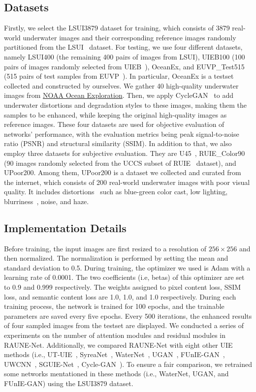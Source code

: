 \documentclass[runningheads]{llncs}
\begin{document}
\subsection{Datasets}
Firstly, we select the LSUI3879 dataset for training, which consists of 3879 real-world underwater images and their corresponding reference images randomly partitioned from the LSUI~\cite{peng2023ushape} dataset. For testing, we use four different datasets, namely LSUI400 (the remaining 400 pairs of images from LSUI), UIEB100 (100 pairs of images randomly selected from UIEB~\cite{li2020underwater}), OceanEx, and EUVP\_Test515 (515 pairs of test samples from EUVP~\cite{islam2020fast}). In particular, OceanEx is a testset collected and constructed by ourselves. We gather 40 high-quality underwater images from \href{https://oceanexplorer.noaa.gov/image-gallery/welcome.html}{NOAA Ocean Exploration}. Then, we apply CycleGAN~\cite{Zhu_2017_ICCV} to add underwater distortions and degradation styles to these images, making them the samples to be enhanced, while keeping the original high-quality images as reference images. These four datasets are used for objective evaluation of networks' performance, with the evaluation metrics being peak signal-to-noise ratio (PSNR) and structural similarity (SSIM). In addition to that, we also employ three datasets for subjective evaluation. They are U45~\cite{li2019fusion}, RUIE\_Color90 (90 images randomly selected from the UCCS subset of RUIE~\cite{liu2020real} dataset), and UPoor200. Among them, UPoor200 is a dataset we collected and curated from the internet, which consists of 200 real-world underwater images with poor visual quality. It includes distortions~\cite{liu2019unsupervised} such as blue-green color cast, low lighting, blurriness~\cite{liu2017quality}, noise, and haze.

\subsection{Implementation Details}
Before training, the input images are first resized to a resolution of $256\times256$ and then normalized. The normalization is performed by setting the mean and standard deviation to 0.5. During training, the optimizer we used is Adam with a learning rate of 0.0001. The two coefficients (i.e, betas) of this optimizer are set to 0.9 and 0.999 respectively. The weights assigned to pixel content loss, SSIM loss, and semantic content loss are 1.0, 1.0, and 1.0 respectively. During each training process, the network is trained for 100 epochs, and the trainable parameters are saved every five epochs. Every 500 iterations, the enhanced results of four sampled images from the testset are displayed. We conducted a series of experiments on the number of attention modules and residual modules in RAUNE-Net. Additionally, we compared RAUNE-Net with eight other UIE methods (i.e., UT-UIE~\cite{peng2023ushape}, SyreaNet~\cite{wen2023syreanet}, WaterNet~\cite{li2019underwater}, UGAN~\cite{fabbri2018enhancing}, FUnIE-GAN~\cite{islam2020fast}, UWCNN~\cite{li2020underwater}, SGUIE-Net~\cite{qi2022sguie}, Cycle-GAN~\cite{li2018emerging}). To ensure a fair comparison, we retrained some networks mentationed in these methods (i.e., WaterNet, UGAN, and FUnIE-GAN) using the LSUI3879 dataset.
\end{document}
